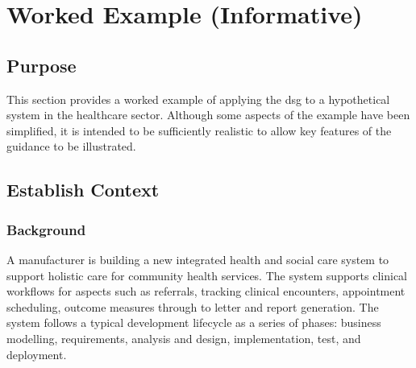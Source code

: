 %
%
\section{Worked Example (Informative)} \label{bkm:workedexample}


\subsection{Purpose}
This section provides a worked example of applying the \gls{dsg} to a hypothetical system in the healthcare sector. Although some aspects of the example have been simplified, it is intended to be sufficiently realistic to allow key features of the guidance to be illustrated.

\subsection{Establish Context}

\subsubsection{Background}
A manufacturer is building a new integrated health and social care system to support holistic care for community health services. The system supports clinical workflows for aspects such as referrals, tracking clinical encounters, appointment scheduling, outcome measures through to letter and report generation. The system follows a typical development lifecycle as a series of phases: business modelling, requirements, analysis and design, implementation, test, and deployment. 

